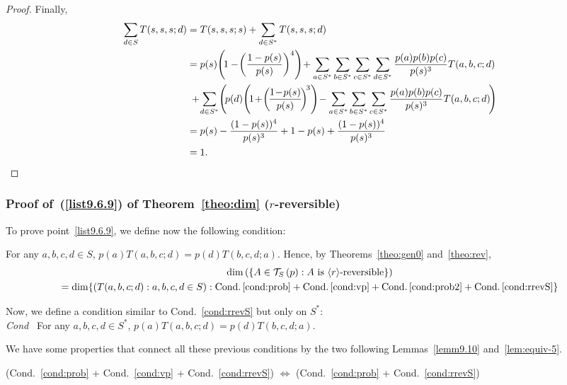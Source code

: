 \documentclass[AHL,Unicode,longabstracts]{cedram}
\DeclarePairedDelimiter{\vect}{\langle}{\rangle}
\newcounter{a}
\newcommand{\Cond}{Cond.}
\newenvironment{cond}{\refstepcounter{a}{\upshape\emph{Cond.~\thea}}\pointir}{}
\newenvironment{condd}{{\upshape\emph{Cond~\thea*}\pointir}}{}
\newcommand{\triang}[2]{\mathcal{T}_{#1} \left(#2 \right)}
\begin{document}
\begin{proof}
Finally,
\begin{align*}
\sum_{d \in S} T(s,s,s;d) & = T(s,s,s;s) + \sum_{d \in S^*} T(s,s,s;d) \\
& =p(s)\!\left(\!1 -\!\left(\frac{1-p(s)}{p(s)} \right)^4 \right)\!+ \sum_{a \in S^*} \sum_{b \in S^*} \sum_{c \in S^*} \sum_{d \in S^*} \frac{p(a)p(b)p(c)}{p(s)^3}T(a,b,c;d) \\
&\; +\!\sum_{d \in S^*}\!\left(\!p(d)\!\left(\!1\!+\!\left(\!\frac{1\!-\!p(s)}{p(s)}\!\right)^{\!3}\right)\!- \sum_{a \in S^*} \sum_{b \in S^*} \sum_{c \in S^*} \frac{p(a)p(b)p(c)}{p(s)^3}T(a,b,c;d)\!\right) \\
& = p(s) - \frac{(1-p(s))^4}{p(s)^3} + 1 - p(s) + \frac{(1-p(s))^4}{p(s)^3} \\
& = 1.\mathrlap{\mkern 460mu \qed}
\end{align*}
\let\qed\relax
\end{proof}

\subsubsection{Proof of~(\ref{list9.6.9}) of Theorem~\ref{theo:dim} (\texorpdfstring{$r$}{r}-reversible)} To prove point~\eqref{list9.6.9}, we define now the following condition:

\begin{cond} \label{cond:rrevS}
For any $a,b,c,d \in S$, $p(a) T(a,b,c;d) = p(d) T(b,c,d;a)$.
\end{cond}
Hence, by Theorems~\ref{theo:gen0} and~\ref{theo:rev},
\begin{multline}
\dim \left(\{A \in \triang{S}{p} : \text{$A$ is $\vect{r}$-reversible}\} \right) \label{eq:p5th-1}
\\
= \dim \{(T(a,b,c;d) : a,b,c,d \in S) : \textnormal{\Cond}\,\ref{cond:prob} + \textnormal{\Cond}\,\ref{cond:vp} + \textnormal{\Cond}\,\ref{cond:prob2} + \textnormal{\Cond}\,\ref{cond:rrevS}\}
\end{multline}

Now, we define a condition similar to \Cond~\ref{cond:rrevS} but only on $S^*$:\\
\begin{condd} \label{cond:rrevS*}
For any $a,b,c,d \in S^*$, $p(a) T(a,b,c;d) = p(d) T(b,c,d;a)$.
\end{condd}

We have some properties that connect all these previous conditions by the two following Lemmas~\ref{lemm9.10} and~\ref{lem:equiv-5}.
\begin{lemm}\label{lemm9.10}
(\Cond~\ref{cond:prob} + \Cond~\ref{cond:vp} + \Cond~\ref{cond:rrevS}) $\Leftrightarrow$ (\Cond~\ref{cond:prob} + \Cond~\ref{cond:rrevS})
\end{lemm}
\end{document}
